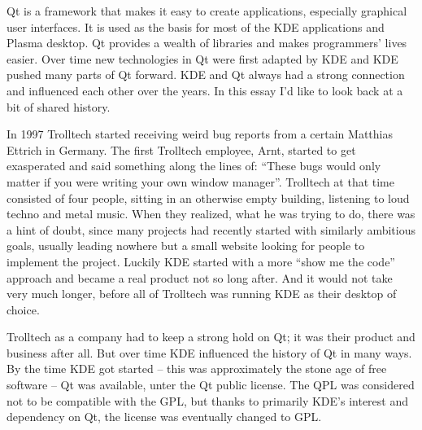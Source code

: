 

\noindent{}Qt is a framework that makes it easy to create applications, especially graphical user interfaces. It is used as the basis for most of the KDE applications and Plasma desktop. Qt provides a wealth of libraries and makes programmers' lives easier. Over time new technologies in Qt were first adapted by KDE and KDE pushed many parts of Qt forward. KDE and Qt always had a strong connection and influenced each other over the years. In this essay I'd like to look back at a bit of shared history.

In 1997 Trolltech started receiving weird bug reports from a certain Matthias Ettrich in Germany. The first Trolltech employee, Arnt, started to get exasperated and said something along the lines of: “These bugs would only matter if you were writing your own window manager”. Trolltech at that time consisted of four people, sitting in an otherwise empty building, listening to loud techno and metal music. When they realized, what he was trying to do, there was a hint of doubt, since many projects had recently started with similarly ambitious goals, usually leading nowhere but a small website looking for people to implement the project. Luckily KDE started with a more “show me the code” approach and became a real product not so long after. And it would not take very much longer, before all of Trolltech was running KDE as their desktop of choice.

Trolltech as a company had to keep a strong hold on Qt; it was their product and business after all. But over time KDE influenced the history of Qt in many ways. By the time KDE got started – this was approximately the stone age of free software – Qt was available, unter the Qt public license. The QPL was considered not to be compatible with the GPL, but thanks to primarily KDE’s interest and dependency on Qt, the license was eventually changed to GPL.

